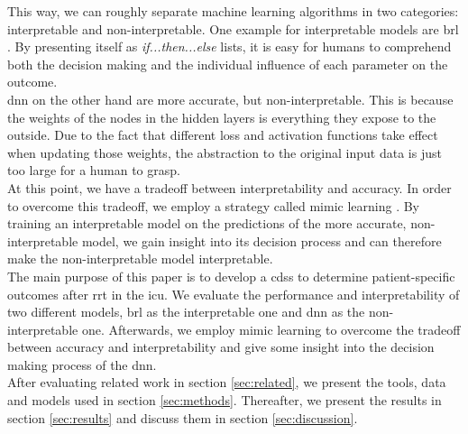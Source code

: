 \documentclass[conference,comsoc]{IEEEtran}
\begin{document}
This way, we can roughly separate machine learning algorithms in two categories: interpretable and non-interpretable. 
One example for interpretable models are \gls{brl} \cite{Letham2015}.
By presenting itself as \emph{if...then...else} lists, it is easy for humans to comprehend both the decision making and the individual influence of each parameter on the outcome. \\
\gls{dnn} on the other hand are more accurate, but non-interpretable.
This is because the weights of the nodes in the hidden layers is everything they expose to the outside.
Due to the fact that different loss and activation functions take effect when updating those weights, the abstraction to the original input data is just too large for a human to grasp. \\
At this point, we have a tradeoff between interpretability and accuracy.
In order to overcome this tradeoff, we employ a strategy called mimic learning \cite{Che2016}.
By training an interpretable model on the predictions of the more accurate, non-interpretable model, we gain insight into its decision process and can therefore make the non-interpretable model interpretable. \\

The main purpose of this paper is to develop a \gls{cdss} to determine patient-specific outcomes after \gls{rrt} in the \gls{icu}.
We evaluate the performance and interpretability of two different models, \gls{brl} as the interpretable one and \gls{dnn} as the non-interpretable one.
Afterwards, we employ mimic learning to overcome the tradeoff between accuracy and interpretability and give some insight into the decision making process of the \gls{dnn}. \\

After evaluating related work in section \ref{sec:related}, we present the tools, data and models used in section \ref{sec:methods}.
Thereafter, we present the results in section \ref{sec:results} and discuss them in section \ref{sec:discussion}.
\end{document}
